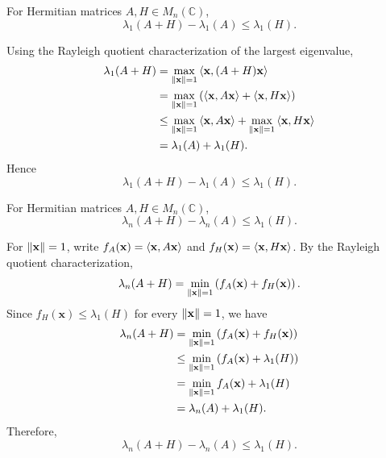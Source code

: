\begin{proposition}
For Hermitian matrices $A,H\in M_n(\mathbb{C})$,
\[
    \lambda_1(A+H)-\lambda_1(A)\le\lambda_1(H).
\]
\label{prop:first-eigenvalue-diff-upper-bound}
\end{proposition}

\begin{pfbox}
Using the Rayleigh quotient characterization of the largest eigenvalue,
\begin{align*}
    \lambda_1(A+H)
    &=
    \max_{\left\lVert \mathbf{x} \right\rVert=1}
    \left\langle \mathbf{x}, (A+H)\mathbf{x} \right\rangle                         \\
    &=
    \max_{\left\lVert \mathbf{x} \right\rVert=1}
    \left( 
    \left\langle \mathbf{x}, A\mathbf{x} \right\rangle
    +
    \left\langle \mathbf{x}, H\mathbf{x} \right\rangle
     \right)                                                                  \\
    &\le
    \max_{\left\lVert \mathbf{x} \right\rVert=1}
    \left\langle \mathbf{x}, A\mathbf{x} \right\rangle
    +
    \max_{\left\lVert \mathbf{x} \right\rVert=1}
    \left\langle \mathbf{x}, H\mathbf{x} \right\rangle                              \\
    &=
    \lambda_1(A)+\lambda_1(H).
\end{align*}
Hence
\[
    \lambda_1(A+H)-\lambda_1(A)
    \le
    \lambda_1(H).
\]
\end{pfbox}


\begin{proposition}
For Hermitian matrices $A,H\in M_n(\mathbb{C})$,
\[
    \lambda_n(A+H)-\lambda_n(A)\le\lambda_1(H).
\]
\end{proposition}

\begin{pfbox}
For $\left\lVert \mathbf{x} \right\rVert=1$, write
$f_A(\mathbf{x})=\left\langle \mathbf{x}, A\mathbf{x} \right\rangle$ and
$f_H(\mathbf{x})=\left\langle \mathbf{x}, H\mathbf{x} \right\rangle$.
By the Rayleigh quotient characterization,
\[
    \lambda_n(A+H)
    =
    \min_{\left\lVert \mathbf{x} \right\rVert=1}
    \left( f_A(\mathbf{x})+f_H(\mathbf{x}) \right).
\]
Since $f_H(\mathbf{x})\le \lambda_1(H)$ for every $\left\lVert \mathbf{x} \right\rVert=1$, we have
\begin{align*}
    \lambda_n(A+H)
    &=
    \min_{\left\lVert \mathbf{x} \right\rVert=1}
    \left( f_A(\mathbf{x})+f_H(\mathbf{x}) \right)                                \\
    &\le
    \min_{\left\lVert \mathbf{x} \right\rVert=1}
    \left( f_A(\mathbf{x})+\lambda_1(H) \right)                                    \\
    &=
    \min_{\left\lVert \mathbf{x} \right\rVert=1} f_A(\mathbf{x})
    +
    \lambda_1(H)                                                         \\
    &=
    \lambda_n(A)+\lambda_1(H).
\end{align*}
Therefore,
\[
    \lambda_n(A+H)-\lambda_n(A)
    \le
    \lambda_1(H).
\]
\end{pfbox}


